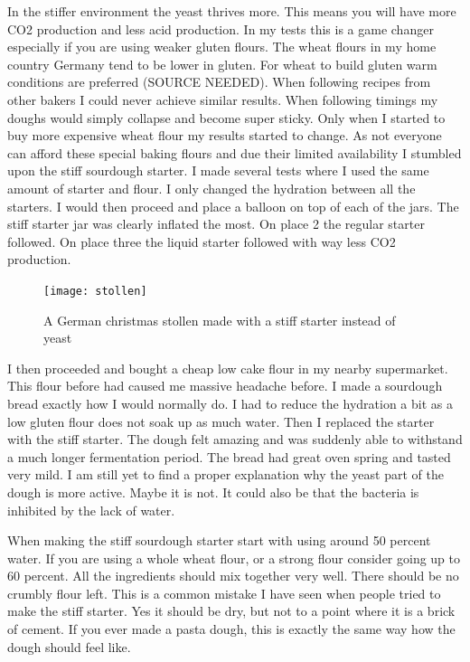In the stiffer environment the yeast thrives more. This means you will have
more CO2 production and less acid production. In my tests this is a game
changer especially if you are using weaker gluten flours. The wheat flours in
my home country Germany tend to be lower in gluten. For wheat to build gluten warm conditions
are preferred (SOURCE NEEDED). When following recipes from other bakers I
could never achieve similar results. When following timings my doughs would
simply collapse and become super sticky. Only when I started to buy more
expensive wheat flour my results started to change. As not everyone can afford
these special baking flours and due their limited availability I stumbled upon the
stiff sourdough starter. I made several tests where I used the same amount of
starter and flour. I only changed the hydration between all the starters. I
would then proceed and place a balloon on top of each of the jars. The stiff
starter jar was clearly inflated the most. On place 2 the regular starter
followed. On place three the liquid starter followed with way less CO2
production.

\begin{figure}[!htb]
  \texttt{[image: stollen]}
  \caption{A German christmas stollen made with a stiff starter instead of yeast}
  \label{fig:stollen}
\end{figure}

I then proceeded and bought a cheap low cake flour in my nearby supermarket.
This flour before had caused me massive headache before. I made a sourdough bread
exactly how I would normally do. I had to reduce the hydration a bit as a low
gluten flour does not soak up as much water. Then I replaced the starter with
the stiff starter. The dough felt amazing and was suddenly able to withstand a
much longer fermentation period. The bread had great oven spring and tasted
very mild. I am still yet to find a proper explanation why the yeast part of
the dough is more active. Maybe it is not. It could also be that the bacteria
is inhibited by the lack of water.

When making the stiff sourdough starter start with using around 50 percent
water. If you are using a whole wheat flour, or a strong flour consider going
up to 60 percent. All the ingredients should mix together very well. There
should be no crumbly flour left. This is a common mistake I have seen when
people tried to make the stiff starter. Yes it should be dry, but not to a
point where it is a brick of cement. If you ever made a pasta dough, this is
exactly the same way how the dough should feel like.

